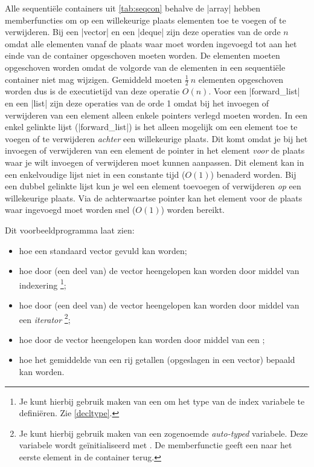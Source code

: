 \begin{cpplstShortInline}
Alle sequentiële containers uit \cref{tab:seqcon} behalve de |array| hebben memberfuncties om op een willekeurige plaats elementen toe te voegen of te verwijderen.
Bij een |vector| en een |deque| zijn deze operaties van de orde $n$ omdat alle elementen vanaf de plaats waar moet worden ingevoegd tot aan het einde van de container opgeschoven moeten worden.
De elementen moeten opgeschoven worden omdat de volgorde van de elementen in een sequentiële container niet mag wijzigen.
Gemiddeld moeten $\frac{1}{2}\:n$ elementen opgeschoven worden dus is de executietijd van deze operatie $O(n)$.
Voor een |forward_list| en een |list| zijn deze operaties van de orde 1 omdat bij het invoegen of verwijderen van een element alleen enkele pointers verlegd moeten worden.
In een enkel gelinkte lijst (|forward_list|) is het alleen mogelijk om een element toe te voegen of te verwijderen \emph{achter} een willekeurige plaats.
Dit komt omdat je bij het invoegen of verwijderen van een element de pointer in het element \emph{voor} de plaats waar je wilt invoegen of verwijderen moet kunnen aanpassen.
Dit element kan in een enkelvoudige lijst niet in een constante tijd ($O(1)$) benaderd worden.
Bij een dubbel gelinkte lijst kun je wel een element toevoegen of verwijderen \emph{op} een willekeurige plaats.
Via de achterwaartse pointer kan het element voor de plaats waar ingevoegd moet worden snel ($O(1)$) worden bereikt.

Dit voorbeeldprogramma  laat zien:
\begin{itemize}
	\item hoe een standaard vector gevuld kan worden;
	\item hoe door (een deel van) de vector heengelopen kan worden door middel van indexering%
	\footnote{
		Je kunt hierbij gebruik maken van een  om het type van de index variabele te definiëren. Zie \cref{decltype}.
	};
	\item hoe door (een deel van) de vector heengelopen kan worden door middel van een \emph{iterator}%
	\footnote{
		Je kunt hierbij gebruik maken van een zogenoemde \emph{auto\hyp{}typed} variabele.
		Deze variabele wordt geïnitialiseerd met .
		De memberfunctie geeft een  naar het eerste element in de container terug.
	};
	\item hoe door de vector heengelopen kan worden door middel van een \emph{};
	\item hoe het gemiddelde van een rij getallen (opgeslagen in een vector) bepaald kan worden.
\end{itemize}


\end{cpplstShortInline}
